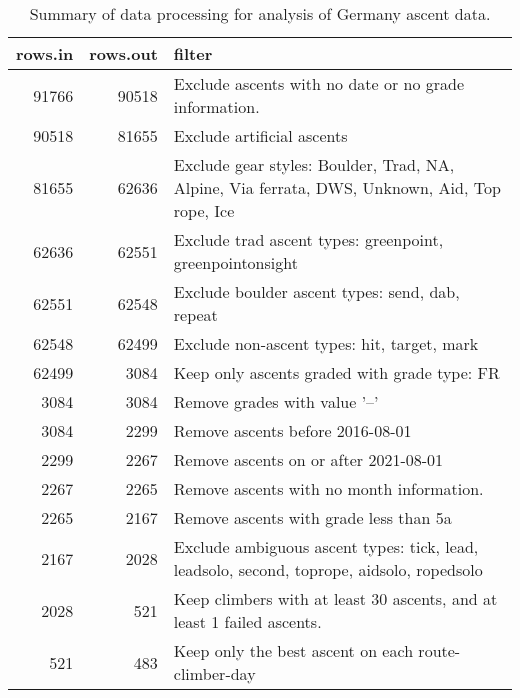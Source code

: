 \begin{table}[ht]
\centering
\begingroup\fontsize{9pt}{10pt}\selectfont
\begin{tabular}{rrl}
  \hline
{\bf rows.in} & {\bf rows.out} & {\bf filter} \\ 
  \hline
91766 & 90518 & Exclude ascents with no date or no grade information. \\ 
  90518 & 81655 & Exclude artificial ascents \\ 
  81655 & 62636 & Exclude gear styles: Boulder, Trad, NA, Alpine, Via ferrata, DWS, Unknown, Aid, Top rope, Ice \\ 
  62636 & 62551 & Exclude trad ascent types: greenpoint, greenpointonsight \\ 
  62551 & 62548 & Exclude boulder ascent types: send, dab, repeat \\ 
  62548 & 62499 & Exclude non-ascent types: hit, target, mark \\ 
  62499 & 3084 & Keep only ascents graded with grade type: FR \\ 
  3084 & 3084 & Remove grades with value '--' \\ 
  3084 & 2299 & Remove ascents before 2016-08-01 \\ 
  2299 & 2267 & Remove ascents on or after 2021-08-01 \\ 
  2267 & 2265 & Remove ascents with no month information. \\ 
  2265 & 2167 & Remove ascents with grade less than 5a \\ 
  2167 & 2028 & Exclude ambiguous ascent types: tick, lead, leadsolo, second, toprope, aidsolo, ropedsolo \\ 
  2028 & 521 & Keep climbers with at least 30 ascents, and at least 1 failed ascents. \\ 
  521 & 483 & Keep only the best ascent on each route-climber-day \\ 
   \hline
\end{tabular}
\endgroup
\caption{Summary of data processing for analysis of Germany ascent data.} 
\label{table-data-processing-germany}
\end{table}
